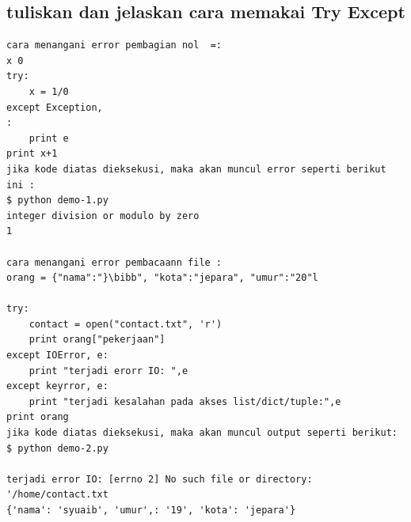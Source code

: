 \subsection{tuliskan dan jelaskan cara memakai Try Except}
\begin{lstlisting}
cara menangani error pembagian nol  =:
x 0
try:
    x = 1/0
except Exception, 
:
    print e
print x+1
jika kode diatas dieksekusi, maka akan muncul error seperti berikut ini :
$ python demo-1.py
integer division or modulo by zero
1

cara menangani error pembacaann file :
orang = {"nama":"}\bibb", "kota":"jepara", "umur":"20"l

try:
    contact = open("contact.txt", 'r')
    print orang["pekerjaan"]
except IOError, e:
    print "terjadi erorr IO: ",e
except keyrror, e:
    print "terjadi kesalahan pada akses list/dict/tuple:",e
print orang
jika kode diatas dieksekusi, maka akan muncul output seperti berikut:
$ python demo-2.py

terjadi error IO: [errno 2] No such file or directory: '/home/contact.txt
{'nama': 'syuaib', 'umur',: '19', 'kota': 'jepara'} 
\end{lstlisting}


